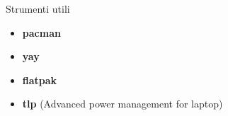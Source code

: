 \begin{frame}{Strumenti utili}
    \begin{itemize}
        \item \textbf{pacman}
        \item \textbf{yay}
        \item \textbf{flatpak}
        \item \textbf{tlp} (Advanced power management for laptop)
    \end{itemize}
\end{frame}